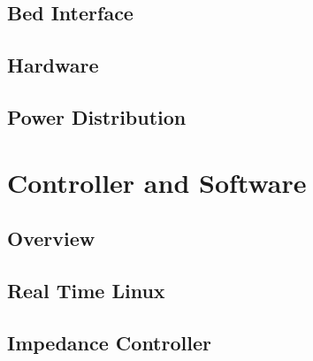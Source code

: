 \documentclass[12pt]{article}
\begin{document}
	\subsection{Bed Interface}
%
	\subsection{Hardware}
%
	\subsection{Power Distribution}

\section{Controller and Software}

	\subsection{Overview}
		
	\subsection{Real Time Linux}
	
%

		
	
	\subsection{Impedance Controller}

%
\end{document}
